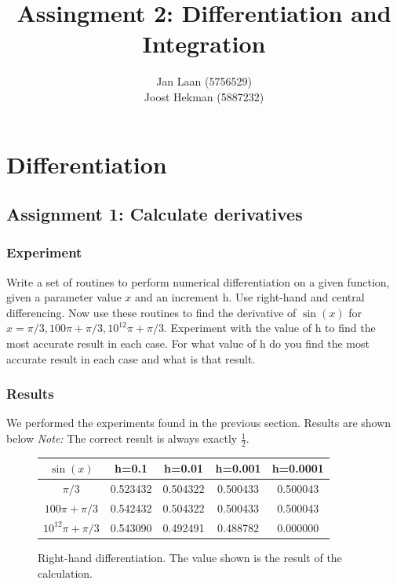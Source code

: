 \documentclass[a4paper,10pt]{article}
\title{Assingment 2: Differentiation and Integration}
\author{Jan Laan (5756529) \\ Joost Hekman (5887232)}
\begin{document}
\maketitle


\section{Differentiation}

\subsection{Assignment 1: Calculate derivatives}
  \subsubsection{Experiment}
  Write a set of routines to perform numerical differentiation on a given function, given a parameter value
  $x$ and an increment h. Use right-hand and central differencing.
  Now use these routines to find the derivative of $\sin(x)$ for $x = \pi/3, 100\pi + \pi/3, 10^{12} \pi + \pi/3$. Experiment with the value of h to find the most accurate result in each case.
  For what value of h do you find the most accurate result in each case and what is that result.
  
  \subsubsection{Results}

  We performed the experiments found in the previous section. Results are shown below
  \textit{Note: } The correct result is always exactly $\frac{1}{2}$.
  
  \begin{figure}[H]
 
    \begin{tabular}{|c|c|c|c|c|}
      \hline
      \textbf{$\sin(x)$} & h=0.1 & h=0.01 & h=0.001 & h=0.0001\\
      \hline
      \hline
      $\pi/3$ & 0.523432 & 0.504322 & 0.500433 & 0.500043\\
      \hline
      $100\pi + \pi/3$ & 0.542432 & 0.504322 & 0.500433 & 0.500043\\
      \hline
      $10^{12} \pi + \pi/3$ & 0.543090 & 0.492491 & 0.488782 & 0.000000\\
      \hline
    \end{tabular}
    \caption{Right-hand differentiation. The value shown is the result of the calculation.}
  \end{figure}
  
\end{document}
